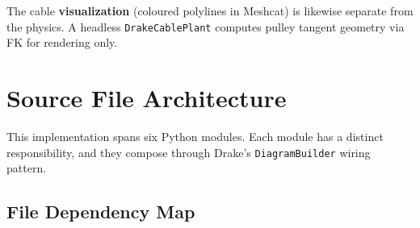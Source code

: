 \documentclass[11pt,a4paper]{article}
\begin{document}
The cable \textbf{visualization} (coloured polylines in Meshcat) is likewise separate from the physics.  A headless \texttt{DrakeCablePlant} computes pulley tangent geometry via FK for rendering only.

\newpage

\section{Source File Architecture}
\label{sec:files}

This implementation spans six Python modules.  Each module has a distinct responsibility, and they compose through Drake's \texttt{DiagramBuilder} wiring pattern.

\subsection{File Dependency Map}
\end{document}
